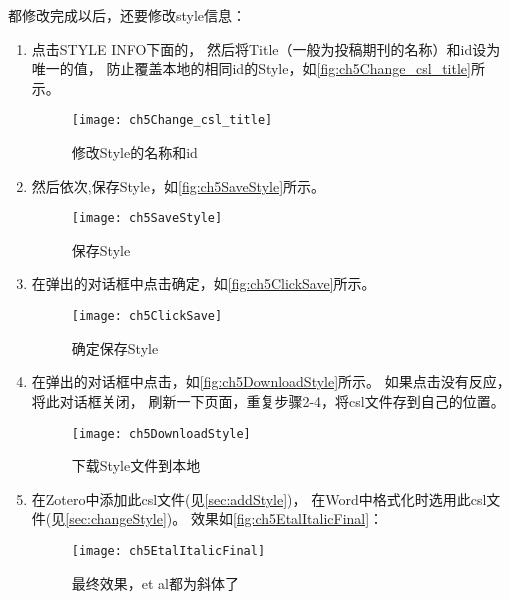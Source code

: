 \documentclass[cn,11pt,chinese]{elegantbook}
\begin{document}
					都修改完成以后，还要修改style信息：
					\begin{enumerate} \label{it:StyleInfo}
					\item 点击STYLE INFO下面的，
					然后将Title（一般为投稿期刊的名称）和id设为唯一的值，
					防止覆盖本地的相同id的Style，如\autoref{fig:ch5Change_csl_title}所示。
					\begin{figure}[htbp]
						\centering
						\texttt{[image: ch5Change\_csl\_title]}
						\caption{修改Style的名称和id}
						\label{fig:ch5Change_csl_title}
					\end{figure}
				\item 然后依次,保存Style，如\autoref{fig:ch5SaveStyle}所示。
					\begin{figure}[htbp]
						\centering
						\texttt{[image: ch5SaveStyle]}
						\caption{保存Style}
						\label{fig:ch5SaveStyle}
					\end{figure}
				\item 在弹出的对话框中点击确定，如\autoref{fig:ch5ClickSave}所示。
					\begin{figure}[htbp]
						\centering
						\texttt{[image: ch5ClickSave]}
						\caption{确定保存Style}
						\label{fig:ch5ClickSave}
					\end{figure}
				\item 在弹出的对话框中点击，如\autoref{fig:ch5DownloadStyle}所示。
				如果点击没有反应，将此对话框关闭，
				刷新一下页面，重复步骤2-4，将csl文件存到自己的位置。
					\begin{figure}[htbp]
						\centering
						\texttt{[image: ch5DownloadStyle]}
						\caption{下载Style文件到本地}
						\label{fig:ch5DownloadStyle}
					\end{figure}
				\item 在Zotero中添加此csl文件(见\cref{sec:addStyle})，
				在Word中格式化时选用此csl文件(见\cref{sec:changeStyle})。
				效果如\autoref{fig:ch5EtalItalicFinal}：
					\begin{figure}[htbp]
						\centering
						\texttt{[image: ch5EtalItalicFinal]}
						\caption{最终效果，et al都为斜体了}
						\label{fig:ch5EtalItalicFinal}
					\end{figure}
				\end{enumerate}	
		
\end{document}
